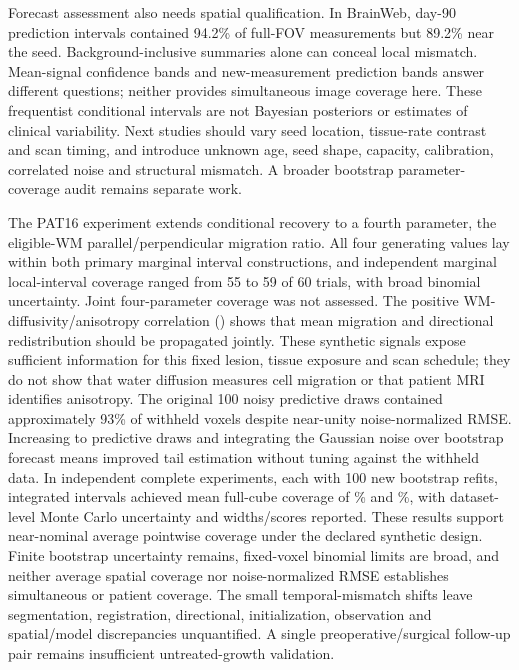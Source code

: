 Forecast assessment also needs spatial qualification. In BrainWeb, day-90 prediction intervals contained 94.2\% of full-FOV measurements but 89.2\% near the seed. Background-inclusive summaries alone can conceal local mismatch. Mean-signal confidence bands and new-measurement prediction bands answer different questions; neither provides simultaneous image coverage here. These frequentist conditional intervals are not Bayesian posteriors or estimates of clinical variability. Next studies should vary seed location, tissue-rate contrast and scan timing, and introduce unknown age, seed shape, capacity, calibration, correlated noise and structural mismatch. A broader bootstrap parameter-coverage audit remains separate work.

The PAT16 experiment extends conditional recovery to a fourth parameter, the eligible-WM parallel/perpendicular migration ratio. All four generating values lay within both primary marginal interval constructions, and independent marginal local-interval coverage ranged from 55 to 59 of 60 trials, with broad binomial uncertainty. Joint four-parameter coverage was not assessed. The positive WM-diffusivity/anisotropy correlation (\PRWMRatioCorrelation{}) shows that mean migration and directional redistribution should be propagated jointly. These synthetic signals expose sufficient information for this fixed lesion, tissue exposure and scan schedule; they do not show that water diffusion measures cell migration or that patient MRI identifies anisotropy. The original 100 noisy predictive draws contained approximately 93\% of withheld voxels despite near-unity noise-normalized RMSE. Increasing to \PPDraws{} predictive draws and integrating the Gaussian noise over bootstrap forecast means improved tail estimation without tuning against the withheld data. In \PPTrials{} independent complete experiments, each with 100 new bootstrap refits, integrated intervals achieved mean full-cube coverage of \PPMixFullSeventyFive\% and \PPMixFullNinety\%, with dataset-level Monte Carlo uncertainty and widths/scores reported. These results support near-nominal average pointwise coverage under the declared synthetic design. Finite bootstrap uncertainty remains, fixed-voxel binomial limits are broad, and neither average spatial coverage nor noise-normalized RMSE establishes simultaneous or patient coverage. The small temporal-mismatch shifts leave segmentation, registration, directional, initialization, observation and spatial/model discrepancies unquantified. A single preoperative/surgical follow-up pair remains insufficient untreated-growth validation.

